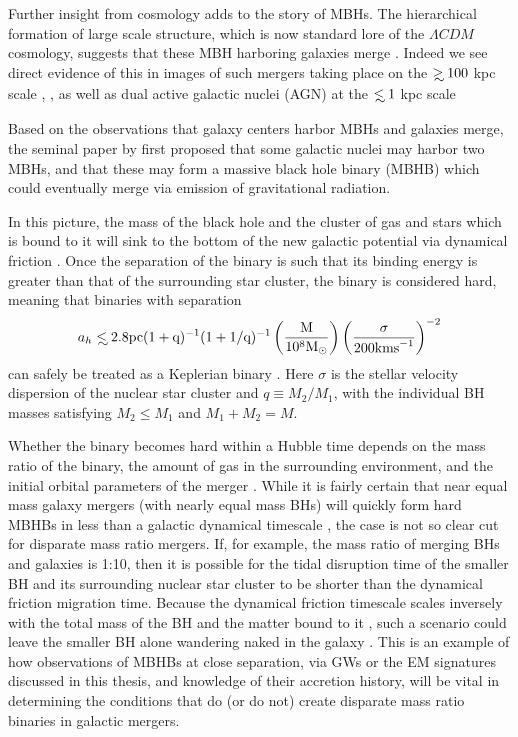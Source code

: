 Further insight from cosmology adds to the story of MBHs. The hierarchical
formation of large scale structure, which is now standard lore of the $\Lambda
CDM$ cosmology, suggests that these MBH harboring galaxies merge \citep{HK2002}.
Indeed we see direct evidence of this in images of such mergers taking place
on the $\gsim 100$ kpc scale \citep{Comerford:2013}, \citep[see also][and
references therein]{Dotti:2012:rev}, as well as dual active galactic nuclei
(AGN) at the $\lsim 1$ kpc scale \citep{Komossa:2003, Fabbiano:2011,Rodriguez:2006, 
BurkeSpolaor:2011, ColpiDotti:2011:rev, Gitti:2013, Woo:subKpcBin:2014,
AndradeSantos:2016}


Based on the observations that galaxy centers harbor MBHs and galaxies merge,
the seminal paper by \cite{Begel:Blan:Rees:1980} first proposed that some
galactic nuclei may harbor two MBHs, and that these may form a massive
black hole binary (MBHB) which could eventually merge via emission of
gravitational radiation.

In this picture, the mass of the black hole and the cluster of gas and stars
which is bound to it will sink to the bottom of the new galactic potential via
dynamical friction \citep{Begel:Blan:Rees:1980, Chandrasekhar:1943}. Once the
separation of the binary is such that its binding energy is
greater than that of the surrounding star cluster, the binary is considered
hard, meaning that binaries with separation
\begin{equation}
a_h \lsim 2.8 \rm{pc} (1+q)^{-1} (1+1/q)^{-1}  \left( \frac{M}{10^8 \Msun} \right)  
\left( \frac{\sigma}{200 \rm{km s}^{-1}} \right)^{-2}
\end{equation}
can safely be treated as a Keplerian binary
\citep[\textit{e.g.}][]{MerrittMilos:2005:LRR}. Here $\sigma$ is the stellar
velocity dispersion of the nuclear star cluster and $q\equiv M_2/M_1$, with
the individual BH masses satisfying $M_2 \leq M_1$ and $M_1+M_2=M$.

Whether the binary becomes hard within a Hubble time depends on the mass ratio
of the binary, the amount of gas in the surrounding environment, and the
initial orbital parameters of the merger \citep{Mayer:2013:MBHBGasRev}. While
it is fairly certain that near equal mass galaxy mergers (with nearly equal
mass BHs) will quickly form hard MBHBs in less than a galactic dynamical
timescale \citep{Mayer+2007, Chapon+2013}, the case is not so clear cut for
disparate mass ratio mergers. If, for example, the mass ratio of merging BHs
and galaxies is 1:10, then it is possible for the tidal disruption time of the
smaller BH and its surrounding nuclear star cluster to be shorter than the
dynamical friction migration time. Because the dynamical friction timescale
scales inversely with the total mass of the BH and the matter bound to it
\citep{Chandrasekhar:1943, ColpiDotti:2011:rev}, such a scenario could leave
the smaller BH alone wandering naked in the galaxy \citep{Callegari:2011,
Mayer:2013:MBHBGasRev}. This is an example of how observations of MBHBs at
close separation, via GWs or the EM signatures discussed in this thesis, and
knowledge of their accretion history, will be vital in determining the
conditions that do (or do not) create disparate mass ratio binaries in
galactic mergers.

